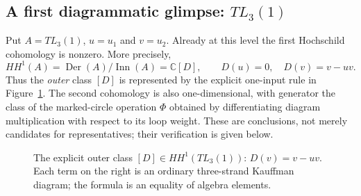 \documentclass[a4paper,11pt,oneside,reqno]{amsart}
\theoremstyle{definition}
\numberwithin{equation}{section}
\begin{document}
\subsection{A first diagrammatic glimpse: $TL_3(1)$}
Put $A=TL_3(1)$, $u=u_1$ and $v=u_2$. Already at this level the first
Hochschild cohomology is nonzero. More precisely,
\begin{equation}\label{intro:HH1-explicit}
 \boxed{HH^1(A)=\operatorname{Der}(A)/\operatorname{Inn}(A)
       =\mathbb C[D],\qquad D(u)=0,\quad D(v)=v-uv.}
\end{equation}
Thus the \emph{outer} class $[D]$ is represented by the explicit
one-input rule in Figure~\ref{fig:intro-TL3}. The second cohomology
is also one-dimensional, with generator the class of the marked-circle
operation $\Phi$ obtained by differentiating diagram multiplication
with respect to its loop weight. These are conclusions, not merely
candidates for representatives; their verification is given below.

\begin{figure}[!htbp]
\centering
\smallskip
{}
\caption{The explicit outer class $[D]\in HH^1(TL_3(1))$:
$D(v)=v-uv$. Each term on the right is an ordinary three-strand
Kauffman diagram; the formula is an equality of algebra elements.}
\label{fig:intro-TL3}
\end{figure}
\end{document}
